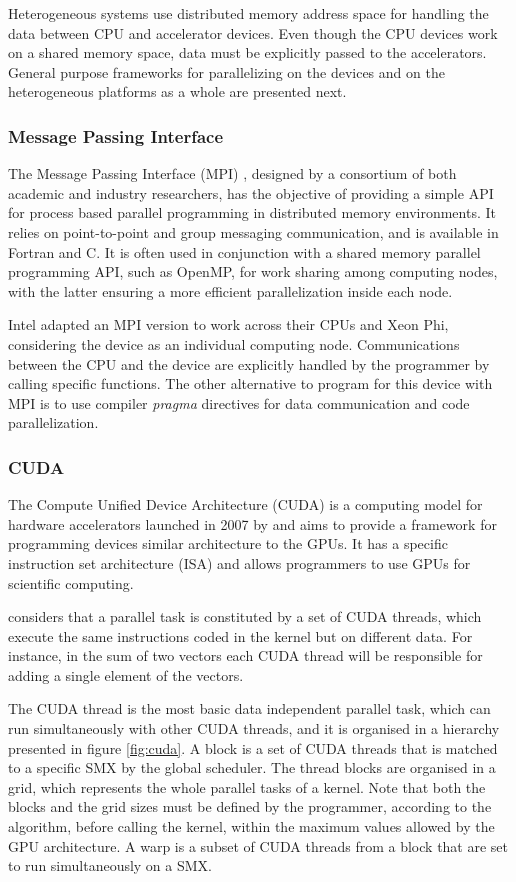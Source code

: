 Heterogeneous systems use distributed memory address space for handling the data between CPU and accelerator devices. Even though the CPU devices work on a shared memory space, data must be explicitly passed to the accelerators. General purpose frameworks for parallelizing on the devices and on the heterogeneous platforms as a whole are presented next.

\subsubsection*{Message Passing Interface}

The Message Passing Interface (MPI) \cite{MPI}, designed by a consortium of both academic and industry researchers, has the objective of providing a simple API for process based parallel programming in distributed memory environments. It relies on point-to-point and group messaging communication, and is available in Fortran and C. It is often used in conjunction with a shared memory parallel programming API, such as OpenMP, for work sharing among computing nodes, with the latter ensuring a more efficient parallelization inside each node.

Intel adapted an MPI version to work across their CPUs and Xeon Phi, considering the device as an individual computing node. Communications between the CPU and the device are explicitly handled by the programmer by calling specific functions. The other alternative to program for this device with MPI is to use compiler \textit{pragma} directives for data communication and code parallelization.

\subsubsection*{CUDA}

The Compute Unified Device Architecture (CUDA) is a computing model for hardware accelerators launched in 2007 by \nvidia and aims to provide a framework for programming devices similar architecture to the \nvidia GPUs. It has a specific instruction set architecture (ISA) and allows programmers to use GPUs for scientific computing.

\nvidia considers that a parallel task is constituted by a set of CUDA threads, which execute the same instructions coded in the kernel but on different data. For instance, in the sum of two vectors each CUDA thread will be responsible for adding a single element of the vectors.

The CUDA thread is the most basic data independent parallel task, which can run simultaneously with other CUDA threads, and it is organised in a hierarchy presented in figure \ref{fig:cuda}. A block is a set of CUDA threads that is matched to a specific SMX by the global scheduler. The thread blocks are organised in a grid, which represents the whole parallel tasks of a kernel. Note that both the blocks and the grid sizes must be defined by the programmer, according to the algorithm, before calling the kernel, within the maximum values allowed by the GPU architecture. A warp is a subset of CUDA threads from a block that are set to run simultaneously on a SMX.


